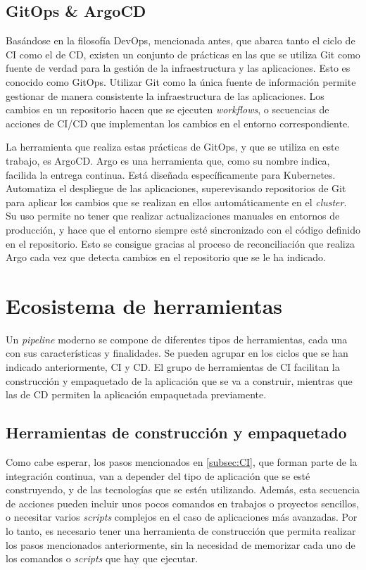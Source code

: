 \subsection*{GitOps \& ArgoCD}

Basándose en la filosofía DevOps, mencionada antes, que abarca tanto el ciclo de CI como el de CD, existen un conjunto de prácticas en las que se utiliza Git como fuente de verdad para la gestión de la infraestructura y las aplicaciones. Esto es conocido como GitOps. Utilizar Git como la única fuente de información permite gestionar de manera consistente la infraestructura de las aplicaciones. Los cambios en un repositorio hacen que se ejecuten \textit{workflows}, o secuencias de acciones de CI/CD que implementan los cambios en el entorno correspondiente.

La herramienta que realiza estas prácticas de GitOps, y que se utiliza en este trabajo, es ArgoCD. Argo es una herramienta que, como su nombre indica, facilida la entrega continua. Está diseñada específicamente para Kubernetes. Automatiza el despliegue de las aplicaciones, superevisando repositorios de Git para aplicar los cambios que se realizan en ellos automáticamente en el \textit{cluster}. Su uso permite no tener que realizar actualizaciones manuales en entornos de producción, y hace que el entorno siempre esté sincronizado con el código definido en el repositorio. Esto se consigue gracias al proceso de reconciliación que realiza Argo cada vez que detecta cambios en el repositorio que se le ha indicado.

\section{Ecosistema de herramientas}

Un \textit{pipeline} moderno se compone de diferentes tipos de herramientas, cada una con sus características y finalidades. Se pueden agrupar en los ciclos que se han indicado anteriormente, CI y CD. El grupo de herramientas de CI facilitan la construcción y empaquetado de la aplicación que se va a construir, mientras que las de CD permiten la aplicación empaquetada previamente.

\subsection*{Herramientas de construcción y empaquetado}

Como cabe esperar, los pasos mencionados en \ref{subsec:CI}, que forman parte de la integración continua, van a depender del tipo de aplicación que se esté construyendo, y de las tecnologías que se estén utilizando. Además, esta secuencia de acciones pueden incluir unos pocos comandos en trabajos o proyectos sencillos, o necesitar varios \textit{scripts} complejos en el caso de aplicaciones más avanzadas. Por lo tanto, es necesario tener una herramienta de construcción que permita realizar los pasos mencionados anteriormente, sin la necesidad de memorizar cada uno de los comandos o \textit{scripts} que hay que ejecutar.

